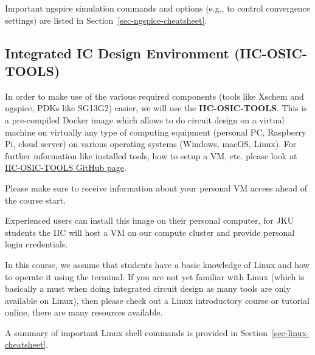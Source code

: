 \documentclass[
  a4paper,
  DIV=11,
  numbers=noendperiod]{scrartcl}
\begin{document}
Important ngspice simulation commands and options (e.g., to control
convergence settings) are listed in
Section~\ref{sec-ngspice-cheatsheet}.

\subsection{Integrated IC Design Environment
(IIC-OSIC-TOOLS)}\label{integrated-ic-design-environment-iic-osic-tools}

In order to make use of the various required components (tools like
Xschem and ngspice, PDKs like SG13G2) easier, we will use the
\textbf{IIC-OSIC-TOOLS}. This is a pre-compiled Docker image which
allows to do circuit design on a virtual machine on virtually any type
of computing equipment (personal PC, Raspberry Pi, cloud server) on
various operating systems (Windows, macOS, Linux). For further
information like installed tools, how to setup a VM, etc. please look at
\href{https://github.com/iic-jku/IIC-OSIC-TOOLS}{IIC-OSIC-TOOLS GitHub
page}.

\begin{tcolorbox}[enhanced jigsaw, titlerule=0mm, left=2mm, coltitle=black, toprule=.15mm, breakable, opacitybacktitle=0.6, colframe=quarto-callout-warning-color-frame, bottomtitle=1mm, toptitle=1mm, opacityback=0, colbacktitle=quarto-callout-warning-color!10!white, title=\textcolor{quarto-callout-warning-color}{\faExclamationTriangle}\hspace{0.5em}{Preparation}, arc=.35mm, rightrule=.15mm, colback=white, bottomrule=.15mm, leftrule=.75mm]

Please make sure to receive information about your personal VM access
ahead of the course start.

\end{tcolorbox}

Experienced users can install this image on their personal computer, for
JKU students the IIC will host a VM on our compute cluster and provide
personal login credentials.

\begin{tcolorbox}[enhanced jigsaw, titlerule=0mm, left=2mm, coltitle=black, toprule=.15mm, breakable, opacitybacktitle=0.6, colframe=quarto-callout-warning-color-frame, bottomtitle=1mm, toptitle=1mm, opacityback=0, colbacktitle=quarto-callout-warning-color!10!white, title=\textcolor{quarto-callout-warning-color}{\faExclamationTriangle}\hspace{0.5em}{Linux}, arc=.35mm, rightrule=.15mm, colback=white, bottomrule=.15mm, leftrule=.75mm]

In this course, we assume that students have a basic knowledge of Linux
and how to operate it using the terminal. If you are not yet familiar
with Linux (which is basically a must when doing integrated circuit
design as many tools are only available on Linux), then please check out
a Linux introductory course or tutorial online, there are many resources
available.

A summary of important Linux shell commands is provided in
Section~\ref{sec-linux-cheatsheet}.

\end{tcolorbox}
\end{document}
